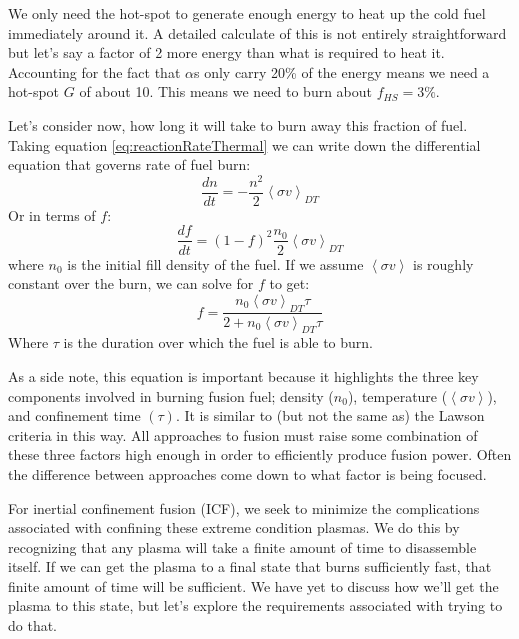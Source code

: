 	\begin{figure}[h!]
		\centering
		\caption{}
		\label{fig:hotspot}
	\end{figure}

	We only need the hot-spot to generate enough energy to heat up the cold fuel immediately around it. A detailed calculate of this is not entirely straightforward but let's say a factor of 2 more energy than what is required to heat it. Accounting for the fact that $\alpha$s only carry 20\% of the energy means we need a hot-spot $G$ of about 10. This means we need to burn about $f_{HS}=3\%$. 
	
	Let's consider now, how long it will take to burn away this fraction of fuel. Taking equation \ref{eq:reactionRateThermal} we can write down the differential equation that governs rate of fuel burn:
	\begin{equation}
		\dfrac{dn}{dt} = - \frac{n^2}{2}\left<\sigma v\right>_{DT}
	\end{equation}
	Or in terms of $f$:
	\begin{equation}
		\frac{df}{dt} = (1-f)^2\frac{n_0}{2}\left<\sigma v\right>_{DT}
	\end{equation}
	where $n_0$ is the initial fill density of the fuel. If we assume $\left<\sigma v\right>$ is roughly constant over the burn, we can solve for $f$ to get:
	\begin{equation}
		f = \frac{n_0\left<\sigma v\right>_{DT}\tau}{2 + n_0\left<\sigma v\right>_{DT} \tau}
		\label{eq:fuelFraction}
	\end{equation}
	Where $\tau$ is the duration over which the fuel is able to burn. 
	
	As a side note, this equation is important because it highlights the three key components involved in burning fusion fuel; density ($n_0$), temperature ($\left<\sigma v\right>$), and confinement time $(\tau)$. It is similar to (but not the same as) the Lawson criteria in this way. All approaches to fusion must raise some combination of these three factors high enough in order to efficiently produce fusion power. Often the difference between approaches come down to what factor is being focused.

	For inertial confinement fusion (ICF), we seek to minimize the complications associated with confining these extreme condition plasmas. We do this by recognizing that any plasma will take a finite amount of time to disassemble itself. If we can get the plasma to a final state that burns sufficiently fast, that finite amount of time will be sufficient. We have yet to discuss how we'll get the plasma to this state, but let's explore the requirements associated with trying to do that.
	
